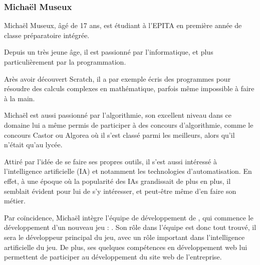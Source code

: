 \subsubsection*{Michaël Museux}

Michaël Museux, âgé de 17 ans, est étudiant à l'EPITA en première année de classe préparatoire intégrée. 

Depuis un très jeune âge, il est passionné par l'informatique, et plus particulièrement par la programmation.

Arès avoir découvert Scratch, il a par exemple écris des programmes pour résoudre des calculs complexes en mathématique, parfois même impossible à faire à la main.

Michaël est aussi passionné par l'algorithmie, son excellent niveau dans ce domaine lui a même permis de participer à des concours d'algorithmie, comme le concours Castor ou Algorea où il s'est classé parmi les meilleurs, alors qu'il n'était qu'au lycée. 

Attiré par l'idée de se faire ses propres outils, il s'est aussi intéressé à l’intelligence artificielle (IA) et notamment les technologies d’automatisation.
En effet, à une époque où la popularité des IAs grandissait de plus en plus, il semblait évident pour lui de s'y intéresser, et peut-être même d'en faire son métier.


Par coïncidence, Michaël intègre l'équipe de développement de \textit{\companyName}, qui commence le développement d'un nouveau jeu : \textit{\gameName}. 
Son rôle dans l'équipe est donc tout trouvé, il sera le développeur principal du jeu, avec un rôle important dans l'intelligence artificielle du jeu.
De plus, ses quelques compétences en développement web lui permettent de participer au développement du site web de l'entreprise.

